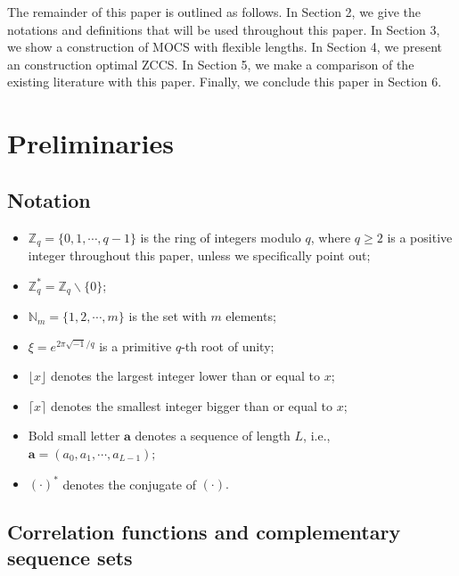 \documentclass[11pt]{article}
\newcommand{\2} {$2$-to-$1$}
\begin{document}
The remainder of this paper is outlined as follows. In Section 2, we give the notations and definitions that will be used throughout this paper. In Section 3, we show  a construction of MOCS with flexible lengths. In Section 4, we present  an construction optimal ZCCS. In Section 5, we  make a comparison of the existing literature with this paper. Finally, we conclude this paper in Section 6.
\section{Preliminaries}
\subsection{Notation}
\begin{itemize}
	\item $\mathbb{Z}_{q}=\{0,1,\cdots,q-1\}$ is the ring of integers modulo $q$, where $q\geq 2$ is a positive integer throughout this paper, unless we specifically point out;
	\item $\mathbb{Z}^{*}_{q}=\mathbb{Z}_{q}\backslash \{0\}$;
	\item $\mathbb{N}_{m}=\{1,2,\cdots,m\}$ is the set with $m$ elements;
	\item $\xi=e^{2\pi\sqrt{-1}/q}$ is a primitive $q$-th root of unity;
	\item $\lfloor x\rfloor$ denotes the largest integer lower than or equal to $x$;
	\item $\lceil x\rceil$ denotes the smallest integer bigger than or equal to $x$;
	\item Bold small letter $\mathbf{a}$ denotes a sequence of length $L$, i.e., $\mathbf{a}=(a_{0}, a_{1},\cdots,a_{L-1});$
	\item $(\cdot)^{*}$ denotes the conjugate of  $(\cdot).$
\end{itemize}

\subsection{Correlation functions and complementary sequence sets}
\end{document}
